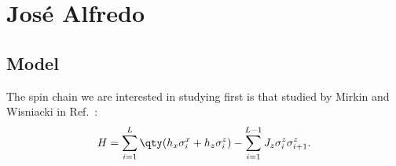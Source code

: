 
%
%
%
%

\section{José Alfredo}

\subsection{Model}
The spin chain we are interested in studying first is that studied by 
Mirkin and Wisniacki in Ref.~\cite{mirkin2021quantum}:
\begin{equation}\label{eq:H:wisniacki:ising:chain}
H = 
\sum_{i=1}^{L}
\qty(
h_x \sigma_i^x +
h_z \sigma_i^z
) -
\sum_{i=1}^{L-1}
J_z \sigma_{i}^z \sigma_{i+1}^z.
\end{equation}
